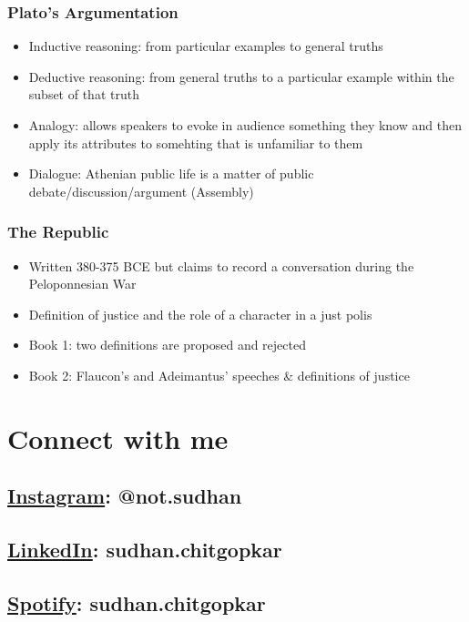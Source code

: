 \documentclass[11pt]{article}
\begin{document}
\subsubsection{Plato's Argumentation}
\label{sec:orgc90ddc1}
\begin{itemize}
\item Inductive reasoning: from particular examples to general truths
\item Deductive reasoning: from general truths to a particular example within the subset of that truth
\item Analogy: allows speakers to evoke in audience something they know and then apply its attributes
to somehting that is unfamiliar to them
\item Dialogue: Athenian public life is a matter of public debate/discussion/argument (Assembly)
\end{itemize}

\subsubsection{The Republic}
\label{sec:org02a13e6}
\begin{itemize}
\item Written 380-375 BCE but claims to record a conversation during the Peloponnesian War
\item Definition of justice and the role of a character in a just polis
\item Book 1: two definitions are proposed and rejected
\item Book 2: Flaucon's and Adeimantus' speeches \& definitions of justice
\end{itemize}
\section{Connect with me}
\label{sec:orgbaa84d8}
\subsection{\href{http://instagram.sudhanchitgopkar.com}{Instagram}: @not.sudhan}
\label{sec:org5d27637}
\subsection{\href{https://www.linkedin.com/in/sudhanchitgopkar/}{LinkedIn}: sudhan.chitgopkar}
\label{sec:org2c1daa2}
\subsection{\href{http://spotify.sudhanchitgopkar.com}{Spotify}: sudhan.chitgopkar}
\label{sec:orgfd369b0}
\end{document}
